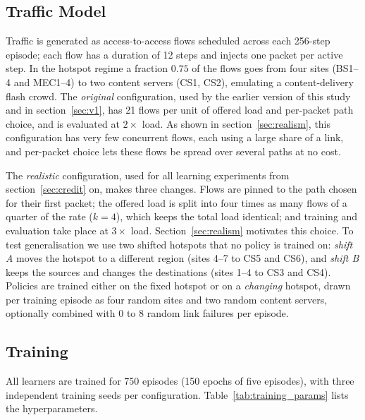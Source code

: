 \documentclass[10pt,journal,comsoc]{IEEEtran}
\begin{document}
\subsection{Traffic Model}
\label{subsec:traffic}
Traffic is generated as access-to-access flows scheduled across each 256-step episode; each flow has a duration of 12 steps and injects one packet per active step. In the hotspot regime a fraction $0.75$ of the flows goes from four sites (BS1--4 and MEC1--4) to two content servers (CS1, CS2), emulating a content-delivery flash crowd. The \emph{original} configuration, used by the earlier version of this study and in section~\ref{sec:v1}, has 21 flows per unit of offered load and per-packet path choice, and is evaluated at $2\times$ load. As shown in section~\ref{sec:realism}, this configuration has very few concurrent flows, each using a large share of a link, and per-packet choice lets these flows be spread over several paths at no cost.

The \emph{realistic} configuration, used for all learning experiments from section~\ref{sec:credit} on, makes three changes. Flows are pinned to the path chosen for their first packet; the offered load is split into four times as many flows of a quarter of the rate ($k{=}4$), which keeps the total load identical; and training and evaluation take place at $3\times$ load. Section~\ref{sec:realism} motivates this choice. To test generalisation we use two shifted hotspots that no policy is trained on: \emph{shift A} moves the hotspot to a different region (sites 4--7 to CS5 and CS6), and \emph{shift B} keeps the sources and changes the destinations (sites 1--4 to CS3 and CS4). Policies are trained either on the fixed hotspot or on a \emph{changing} hotspot, drawn per training episode as four random sites and two random content servers, optionally combined with $0$ to $8$ random link failures per episode.

\subsection{Training}
All learners are trained for 750 episodes (150 epochs of five episodes), with three independent training seeds per configuration. Table~\ref{tab:training_params} lists the hyperparameters.
\end{document}
